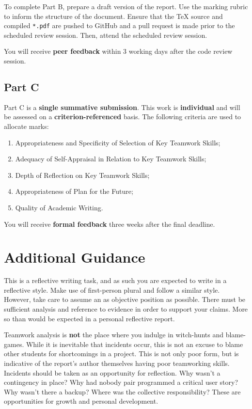 \documentclass{../fal_assignment}
\begin{document}
To complete Part B, prepare a draft version of the report. Use the marking rubric to inform the structure of the document. Ensure that the TeX source and compiled \texttt{*.pdf} are pushed to GitHub and a pull request is made prior to the scheduled review session. Then, attend the scheduled review session.

You will receive \textbf{peer feedback} within 3 working days after the code review session.

\subsection*{Part C}

Part C is a \textbf{single summative submission}. This work is \textbf{individual} and will be assessed on a \textbf{criterion-referenced} basis. The following criteria are used to allocate marks:

\begin{enumerate}[label=(\alph*)]
	\item Appropriateness and Specificity of Selection of Key Teamwork Skills;
	\item Adequacy of Self-Appraisal in Relation to Key Teamwork Skills;
	\item Depth of Reflection on Key Teamwork Skills;
	\item Appropriateness of Plan for the Future;
	\item Quality of Academic Writing.
\end{enumerate}

You will receive \textbf{formal feedback} three weeks after the final deadline.

\section*{Additional Guidance}

This is a reflective writing task, and as such you are expected to write in a reflective style. Make use of first-person plural and follow a similar style. However, take care to assume an as objective position as possible. There must be sufficient analysis and reference to evidence in order to support your claims. More so than would be expected in a personal reflective report.

Teamwork analysis is \textbf{not} the place where you indulge in witch-hunts and blame-games. While it is inevitable that incidents occur, this is not an excuse to blame other students for shortcomings in a project. This is not only poor form, but is indicative of the report's author themselves having poor teamworking skills. Incidents should be taken as an opportunity for reflection. Why wasn't a contingency in place? Why had nobody pair programmed a critical user story? Why wasn't there a backup? Where was the collective responsibility? These are opportunities for growth and personal development.
\end{document}
